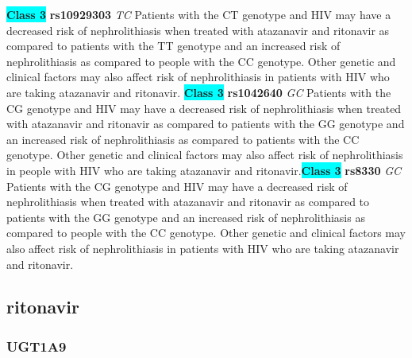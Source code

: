 \documentclass{book}
\begin{document}
\begin{center}
\textbf{\colorbox{cyan} {Class 3}} \textbf{ rs10929303 } \textit{ TC }
Patients with the CT genotype and HIV may have a decreased risk of nephrolithiasis when treated with atazanavir and ritonavir as compared to patients with the TT genotype and an increased risk of nephrolithiasis as compared to people with the CC genotype. Other genetic and clinical factors may also affect risk of nephrolithiasis in patients with HIV who are taking atazanavir and ritonavir. \textbf{\colorbox{cyan} {Class 3}} \textbf{ rs1042640 } \textit{ GC }
Patients with the CG genotype and HIV may have a decreased risk of nephrolithiasis when treated with atazanavir and ritonavir as compared to patients with the GG genotype and an increased risk of nephrolithiasis as compared to patients with the CC genotype. Other genetic and clinical factors may also affect risk of nephrolithiasis in people with HIV who are taking atazanavir and ritonavir.\textbf{\colorbox{cyan} {Class 3}} \textbf{ rs8330 } \textit{ GC }
Patients with the CG genotype and HIV may have a decreased risk of nephrolithiasis when treated with atazanavir and ritonavir as compared to patients with the GG genotype and an increased risk of nephrolithiasis as compared to people with the CC genotype. Other genetic and clinical factors may also affect risk of nephrolithiasis in patients with HIV who are taking atazanavir and ritonavir.


\end{center}\subsection{ ritonavir }


\subsubsection{ UGT1A9 }
\end{document}
